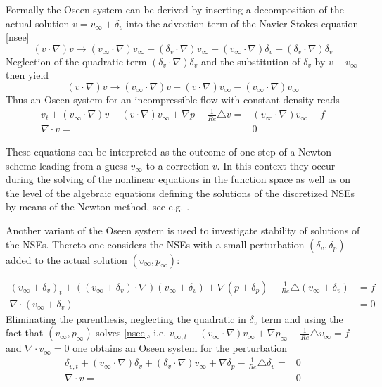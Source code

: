 \documentclass[a4paper,10pt,BCOR=15mm]{scrbook}
\begin{document}
Formally the Oseen system can be derived by inserting a decomposition of the actual solution $v=v_\infty+\delta _v$ into the advection term of the Navier-Stokes equation \eqref{nsee}
\begin{equation*}
 (v\cdot \nabla) v \rightarrow  (v_\infty \cdot \nabla) v_\infty+(\delta _v \cdot \nabla) v_\infty+(v_\infty \cdot \nabla) \delta _v+( \delta_v \cdot \nabla ) \delta_v
\end{equation*}
Neglection of the quadratic term $( \delta_v \cdot \nabla ) \delta_v$ and the substitution of $\delta_v$ by $v-v_\infty$ then yield
\begin{equation*}
 (v\cdot \nabla) v \rightarrow  (v_\infty \cdot \nabla) v+(v \cdot \nabla) v_\infty-(v_\infty \cdot \nabla) v_\infty
\end{equation*}
Thus an Oseen system for an incompressible flow with constant density reads
\begin{subequations}\label{osee}
\begin{align}
 v_t +  (v_\infty \cdot \nabla) v+(v \cdot \nabla) v_\infty+\nabla p - \frac{1}{Re} \triangle v =&  (v_\infty \cdot \nabla) v_\infty + f  \\
\nabla \cdot v =& 0 
\end{align}
\end{subequations}

These equations can be interpreted as the outcome of one step of a Newton-scheme leading from a guess $v_\infty$ to a correction $v$. In this context they occur during the solving of the nonlinear equations in the function space as well as on the level of the algebraic equations defining the solutions of the discretized NSEs by means of the Newton-method, see e.g. \cite{eswa,gira2,gunz,gupe}. 

Another variant of the Oseen system is used to investigate stability of solutions of the NSEs. Thereto one considers the NSEs with a small perturbation $(\delta_v,\delta_p)$ added to the actual solution $(v_\infty,p_\infty)$:

\begin{subequations}
\begin{align*}
 (v_\infty + \delta_v)_t +((v_\infty + \delta_v) \cdot \nabla) (v_\infty + \delta_v)+\nabla (p+\delta_p) - \frac{1}{Re} \triangle (v_\infty + \delta_v)  &=  f \\
\nabla \cdot (v_\infty + \delta_v) &= 0 
\end{align*}
\end{subequations}
Eliminating the parenthesis, neglecting the quadratic in $\delta_v$ term and using the fact that $(v_\infty,p_\infty)$ solves \eqref{nsee}, i.e. $
 v_{\infty,t} +(v_\infty \cdot \nabla) v_\infty+\nabla p_\infty - \frac{1}{Re} \triangle v_\infty  =  f $ and $\nabla \cdot v_\infty = 0$ one obtains an Oseen system for the perturbation
\begin{align}\label{osehyd}
 \delta_{v,t} +  (v_\infty \cdot \nabla) \delta_v+(\delta_v \cdot \nabla) v_\infty+\nabla \delta_p - \frac{1}{Re} \triangle \delta_v =&  0  \\
\nabla \cdot v =& 0 
\end{align}
\end{document}
